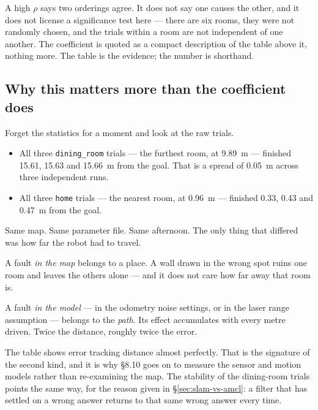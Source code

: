 \documentclass[11pt,a4paper]{report}
\newcommand{\file}[1]{\texttt{\small #1}}
\begin{document}
\begin{warnbox}
A high $\rho$ says two orderings agree. It does not say one causes the other,
and it does not license a significance test here --- there are six rooms, they
were not randomly chosen, and the trials within a room are not independent of
one another. The coefficient is quoted as a compact description of the table
above it, nothing more. The table is the evidence; the number is shorthand.
\end{warnbox}

\subsection{Why this matters more than the coefficient does}

Forget the statistics for a moment and look at the raw trials.

\begin{itemize}[leftmargin=1.4em,itemsep=3pt]
\item All three \file{dining\_room} trials --- the furthest room, at
\SI{9.89}{\metre} --- finished \SI{15.61}{}, \SI{15.63}{} and
\SI{15.66}{\metre} from the goal. That is a spread of \SI{0.05}{\metre}
across three independent runs.
\item All three \file{home} trials --- the nearest room, at \SI{0.96}{\metre}
--- finished \SI{0.33}{}, \SI{0.43}{} and \SI{0.47}{\metre} from the goal.
\end{itemize}

Same map. Same parameter file. Same afternoon. The only thing that differed
was how far the robot had to travel.

\begin{keyidea}
A fault \emph{in the map} belongs to a place. A wall drawn in the wrong spot
ruins one room and leaves the others alone --- and it does not care how far
away that room is.

A fault \emph{in the model} --- in the odometry noise settings, or in the
laser range assumption --- belongs to the \emph{path}. Its effect accumulates
with every metre driven. Twice the distance, roughly twice the error.

The table shows error tracking distance almost perfectly. That is the
signature of the second kind, and it is why \S8.10 goes on to measure the
sensor and motion models rather than re-examining the map. The stability of
the dining-room trials points the same way, for the reason given in
\S\ref{sec:slam-vs-amcl}: a filter that has settled on a wrong answer returns
to that same wrong answer every time.
\end{keyidea}
\end{document}
